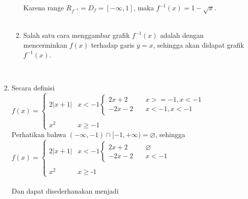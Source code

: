 \documentclass[10pt,openany,a4paper]{article}
\begin{document}
\begin{enumerate}
\begin{enumerate}
            Karena range $R_{f^{-1}}=D_f=[-\infty,1]$, maka $f^{-1}(x)=1-\sqrt{x}$.\\~\\

            \item Salah satu cara menggambar grafik $f^{-1}(x)$ adalah dengan mencerminkan $f(x)$ terhadap garis $y=x$, sehingga akan didapat grafik $f^{-1}(x)$.\\
            \\
            \end{enumerate}
            
            \item Secara definisi $f(x)=\begin{cases}
        2|x+1|&   x < -1\begin{cases}
            2x+2&\quad x>=-1,x<-1\\
             -2x-2&\quad x<-1,x<-1
        \end{cases}\\
        \\
        x^2 &   x \geq -1
        \end{cases}$\\
        Perhatikan bahwa $(-\infty,-1)\cap[-1,+\infty)=\varnothing$, sehingga\\
        $f(x)=\begin{cases}
        2|x+1|&   x < -1\begin{cases}
            2x+2&\quad \varnothing\\
             -2x-2&\quad x<-1
        \end{cases}\\
        \\
        x^2 &   x \geq ‐1
        \end{cases}$\\~\\
        Dan dapat disederhanakan menjadi\\
        

\end{enumerate}
\end{document}

